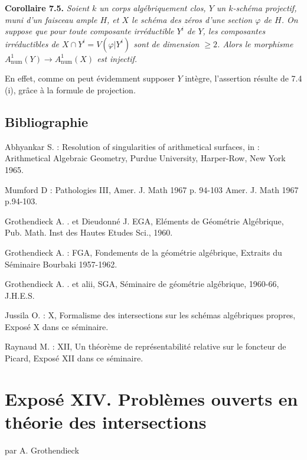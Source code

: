 \textbf{Corollaire 7.5.}
\emph{Soient $k$ un corps alg\'ebriquement clos, $Y$ un $k$-sch\'ema projectif, muni d'un faisceau ample $H$, et $X$ le sch\'ema des z\'eros d'une section $\varphi$ de $H$. On suppose que pour toute composante irr\'eductible $Y^i$ de $Y$, les composantes irr\'eductibles de $X\cap Y^i=V(\varphi|Y^i)$ sont de dimension $\geq2$. Alors le morphisme $A^1_{\mathrm{num}}(Y)\longrightarrow A^1_{\mathrm{num}}(X)$ est injectif.}

En effet, comme on peut \'evidemment supposer $Y$ int\`egre, l'assertion r\'esulte de 7.4 (i), gr\^ace \`a la formule de projection.

\subsection*{Bibliographie}
\begin{enumerate}[label={[\arabic*]}]
\item Abhyankar S. : Resolution of singularities of arithmetical surfaces, in : Arithmetical Algebraic Geometry, Purdue University, Harper-Row, New York 1965.
\item Mumford D : Pathologies III, Amer. J. Math 1967 p. 94-103 Amer. J. Math 1967 p.94-103.
\item Grothendieck A. . et Dieudonn\'e J. EGA, El\'ements de G\'eom\'etrie Alg\'ebrique, Pub. Math. Inst des Hautes Etudes Sci., 1960.
\item Grothendieck A. : FGA, Fondements de la g\'eom\'etrie alg\'ebrique, Extraits du S\'eminaire Bourbaki 1957-1962.
\item Grothendieck A. . et alii, SGA, S\'eminaire de g\'eom\'etrie alg\'ebrique, 1960-66, J.H.E.S.
\item Jussila O. : X, Formalisme des intersections sur les sch\'emas alg\'ebriques propres, Expos\'e X dans ce s\'eminaire.
\item Raynaud M. : XII, Un th\'eor\`eme de repr\'esentabilit\'e relative sur le foncteur de Picard, Expos\'e XII dans ce s\'eminaire.
\end{enumerate}



\providecommand{\Kb}{K^\bullet}
\providecommand{\Db}{D}
\providecommand{\Gtop}{\operatorname{Gr}_{\mathrm{top}}}
\providecommand{\Ftop}{\operatorname{Fil}_{\mathrm{top}}}


\section*{Exposé XIV. Problèmes ouverts en théorie des intersections}
\begin{center}
par A. Grothendieck
\end{center}

